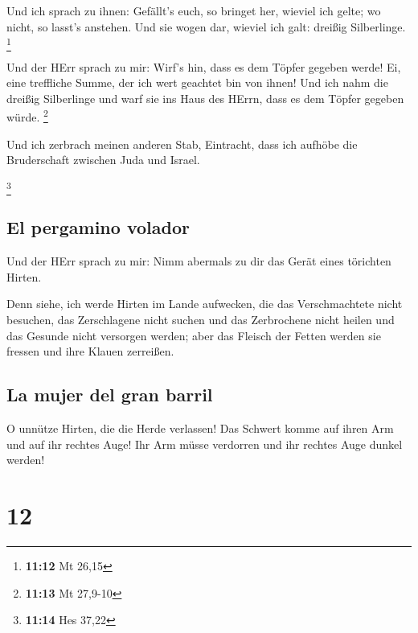  Und ich sprach zu ihnen: Gefällt's euch, so bringet her,
wieviel ich gelte; wo nicht, so lasst's anstehen. Und sie wogen dar,
wieviel ich galt: dreißig Silberlinge. \footnote{\textbf{11:12} Mt 26,15}

 Und der HErr sprach zu mir: Wirf's hin, dass es dem
Töpfer gegeben werde! Ei, eine treffliche Summe, der ich wert geachtet
bin von ihnen! Und ich nahm die dreißig Silberlinge und warf sie ins
Haus des HErrn, dass es dem Töpfer gegeben würde. \footnote{\textbf{11:13}
  Mt 27,9-10}

 Und ich zerbrach meinen anderen Stab, Eintracht, dass
ich aufhöbe die Bruderschaft zwischen Juda und Israel.

\footnote{\textbf{11:14} Hes 37,22}

\hypertarget{el-pergamino-volador}{%
\subsection{El pergamino volador}\label{el-pergamino-volador}}

 Und der HErr sprach zu mir: Nimm abermals zu dir das
Gerät eines törichten Hirten.

 Denn siehe, ich werde Hirten im Lande aufwecken, die das
Verschmachtete nicht besuchen, das Zerschlagene nicht suchen und das
Zerbrochene nicht heilen und das Gesunde nicht versorgen werden; aber
das Fleisch der Fetten werden sie fressen und ihre Klauen zerreißen.

\hypertarget{la-mujer-del-gran-barril}{%
\subsection{La mujer del gran barril}\label{la-mujer-del-gran-barril}}

 O unnütze Hirten, die die Herde verlassen! Das Schwert
komme auf ihren Arm und auf ihr rechtes Auge! Ihr Arm müsse verdorren
und ihr rechtes Auge dunkel werden!

\hypertarget{section-11}{%
\section{12}\label{section-11}}

